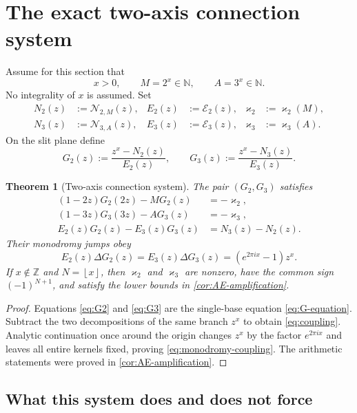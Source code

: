\documentclass[11pt]{article}
\newtheorem{theorem}{Theorem}[section]
\theoremstyle{definition}
\newcommand{\Nker}{\mathscr{N}}
\newcommand{\Eker}{\mathscr{E}}
\newcommand{\kk}{\varkappa}
\newcommand{\N}{\mathbb{N}}
\newcommand{\Z}{\mathbb{Z}}
\newcommand{\floor}[1]{\left\lfloor #1\right\rfloor}
\begin{document}
\section{The exact two-axis connection system}

Assume for this section that
\begin{equation}\label{eq:counterexample-assumption}
 x>0,\qquad M=2^x\in\N,\qquad A=3^x\in\N.
\end{equation}
No integrality of $x$ is assumed.  Set
\begin{align*}
 N_2(z)&:=\Nker_{2,M}(z), & E_2(z)&:=\Eker_2(z),
 & \kk_2&:=\kk_2(M),\\
 N_3(z)&:=\Nker_{3,A}(z), & E_3(z)&:=\Eker_3(z),
 & \kk_3&:=\kk_3(A).
\end{align*}
On the slit plane define
\[
 G_2(z):=\frac{z^x-N_2(z)}{E_2(z)},
 \qquad
 G_3(z):=\frac{z^x-N_3(z)}{E_3(z)}.
\]

\begin{theorem}[Two-axis connection system]\label{thm:two-axis-system}
The pair $(G_2,G_3)$ satisfies
\begin{align}
 (1-2z)G_2(2z)-MG_2(z)&=-\kk_2,
 \label{eq:G2}\tag{$\mathsf Q_2$}\\
 (1-3z)G_3(3z)-AG_3(z)&=-\kk_3,
 \label{eq:G3}\tag{$\mathsf Q_3$}\\
 E_2(z)G_2(z)-E_3(z)G_3(z)&=N_3(z)-N_2(z).
 \label{eq:coupling}\tag{$\mathsf C$}
\end{align}
Their monodromy jumps obey
\begin{equation}\label{eq:monodromy-coupling}
 E_2(z)\Delta G_2(z)
 =E_3(z)\Delta G_3(z)
 =(e^{2\pi ix}-1)z^x.
\end{equation}
If $x\notin\Z$ and $N=\floor{x}$, then $\kk_2$ and $\kk_3$ are nonzero, have the common sign $(-1)^{N+1}$, and satisfy the lower bounds in \cref{cor:AE-amplification}.
\end{theorem}

\begin{proof}
Equations \eqref{eq:G2} and \eqref{eq:G3} are the single-base equation \eqref{eq:G-equation}.  Subtract the two decompositions of the same branch $z^x$ to obtain \eqref{eq:coupling}.  Analytic continuation once around the origin changes $z^x$ by the factor $e^{2\pi ix}$ and leaves all entire kernels fixed, proving \eqref{eq:monodromy-coupling}.  The arithmetic statements were proved in \cref{cor:AE-amplification}.
\end{proof}

\subsection{What this system does and does not force}
\end{document}
